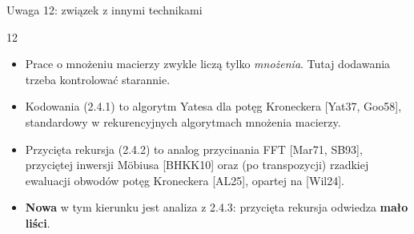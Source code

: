 \begin{frame}{Uwaga 12: związek z innymi technikami}
  \begin{uwagaP}{12}
    \begin{itemize}
      \item Prace o mnożeniu macierzy zwykle liczą tylko \emph{mnożenia}. Tutaj dodawania trzeba kontrolować starannie.
      \item Kodowania (2.4.1) to algorytm Yatesa dla potęg Kroneckera [Yat37, Goo58], standardowy w rekurencyjnych algorytmach
        mnożenia macierzy.
      \item Przycięta rekursja (2.4.2) to analog przycinania FFT [Mar71, SB93], przyciętej inwersji Möbiusa [BHKK10] oraz
        (po transpozycji) rzadkiej ewaluacji obwodów potęg Kroneckera [AL25], opartej na [Wil24].
      \item \textbf{Nowa} w tym kierunku jest analiza z 2.4.3: przycięta rekursja odwiedza \textbf{mało liści}.
    \end{itemize}
  \end{uwagaP}
\end{frame}
